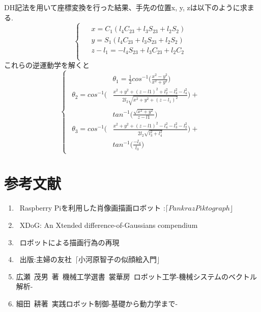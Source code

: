 \documentclass[10pt]{jarticle}
\begin{document}
DH記法を用いて座標変換を行った結果、手先の位置x, y, zは以下のように求まる.
\begin{equation}
	\left\{
		\begin{array}{c}
		\begin{split}
			&x=C_1(l_4C_{23}+l_3S_{23}+l_2S_2) \\
			&y=S_1(l_4C_{23}+l_3S_{23}+l_2S_2) \\
			&z-l_1=-l_4S_{23}+l_3C_{23}+l_2C_2 \\
		\end{split}
	\end{array}
	\right.
\end{equation}
これらの逆運動学を解くと
\begin{equation*}
\left\{
	\begin{array}{c}
	\begin{split}
		&\theta_1=\frac{1}{2}cos^{-1}\biggl( \frac{x^2-y^2}{x^2+y^2} \biggr) \\
		\theta_2= cos^{-1}\biggl(& \frac{x^2+y^2+(z-l1)^2+l_2^2-l_3^2-l_4^2}{2l_2\sqrt{x^2+y^2+(z-l_1)^2}} \biggr)+\\
		&tan^{-1}\biggl( \frac{\sqrt{x^2+y^2}}{z-l1}\biggr) \\
		\theta_3=cos^{-1}\biggl(& \frac{x^2+y^2+(z-l1)^2-l_4^2-l_3^2-l_2^2}{2l_2\sqrt{l_3^2+l_4^2}}\biggr)+\\
		&tan^{-1}\biggl( \frac{-l_4}{l_3}\biggr)
	\end{split}
	\end{array}
\right.
\end{equation*}





\section{参考文献}

\begin{enumerate}
\item {}\rbrack \ Raspberry Piを利用した肖像画描画ロボット :$ \lceil Pankraz Piktograph \rfloor$ \\
\item {}\rbrack \ XDoG: An Xtended difference-of-Gaussians compendium \\
\item {}\rbrack \ ロボットによる描画行為の再現\\
\item {}\rbrack \ 出版:主婦の友社\ $\lceil \text{小河原智子の似顔絵入門} \rfloor$\\
\item 広瀬\ 茂男\ 著\ 機械工学選書\ 裳華房\ ロボット工学-機械システムのベクトル解析-\\
\item 細田\ 耕著\ 実践ロボット制御-基礎から動力学まで- \\
\end{enumerate}
\end{document}

